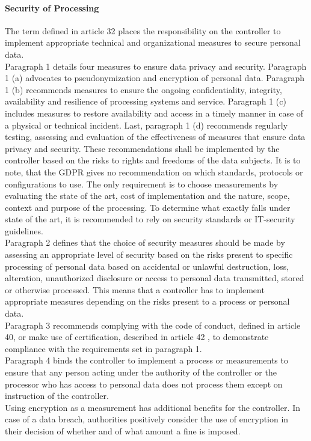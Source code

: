 \paragraph{Security of Processing} The term defined in article 32 places the responsibility on the controller to implement appropriate technical and organizational measures to secure personal data. \\
Paragraph 1 details four measures to ensure data privacy and security. Paragraph 1 (a) advocates to pseudonymization and encryption of personal data. Paragraph 1 (b) recommends measures to ensure the ongoing confidentiality, integrity, availability and resilience of processing systems and service. Paragraph 1 (c) includes measures to restore availability and access in a timely manner in case of a physical or technical incident. Last, paragraph 1 (d) recommends regularly testing, assessing and evaluation of the effectiveness of measures that ensure data privacy and security. These recommendations shall be implemented by the controller based on the risks to rights and freedoms of the data subjects. It is to note, that the GDPR gives no recommendation on which standards, protocols or configurations to use. The only requirement is to choose measurements by evaluating the state of the art, cost of implementation and the nature, scope, context and purpose of the processing. To determine what exactly falls under state of the art, it is recommended to rely on security standards or IT-security guidelines. \\
Paragraph 2 defines that the choice of security measures should be made by assessing an appropriate level of security based on the risks present to specific processing of personal data based on accidental or unlawful destruction, loss, alteration, unauthorized disclosure or access to personal data transmitted, stored or otherwise processed. This means that a controller has to implement appropriate measures depending on the risks present to a process or personal data. \\
Paragraph 3 recommends complying with the code of conduct, defined in article 40\cite{GDPR40}, or make use of certification, described in article 42 \cite{GDPR42}, to demonstrate compliance with the requirements set in paragraph 1.\\
Paragraph 4 binds the controller to implement a process or measurements to ensure that any person acting under the authority of the controller or the processor who has access to personal data does not process them except on instruction of the controller.\\
Using encryption as a measurement has additional benefits for the controller. In case of a data breach, authorities positively consider the use of encryption in their decision of whether and of what amount a fine is imposed.\cite{GDPR32}

